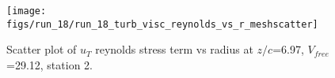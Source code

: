 \begin{figure}[H]
\centering
\texttt{[image: figs/run\_18/run\_18\_turb\_visc\_reynolds\_vs\_r\_meshscatter]}
\caption{Scatter plot of $
u_T$ reynolds stress term vs radius at $z/c$=6.97, $V_{free}$=29.12, station 2.}
\label{fig:run_18_turb_visc_reynolds_vs_r_meshscatter}
\end{figure}


